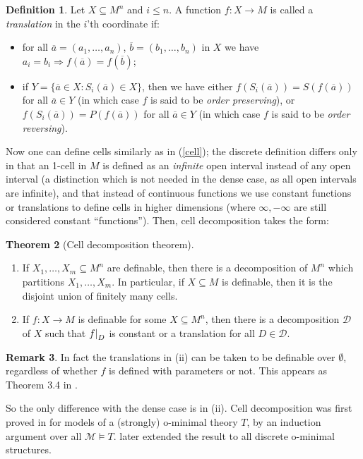 \documentclass[a4paper]{report}
\newcommand{\ind}{\hspace{15pt}}
\newcommand{\D}{\mathcal{D}}
\newcommand{\M}{\mathcal{M}}
\renewcommand{\a}{\overline{a}}
\renewcommand{\b}{\overline{b}}
\renewcommand{\implies}{\Rightarrow}
\newcommand\restr[2]{{\left.\kern-\nulldelimiterspace#1\right|_{#2}}}
\theoremstyle{definition}
\newtheorem{thm}{Theorem}[chapter]
\newtheorem{defn}[thm]{Definition}
\theoremstyle{remstyle}
\newtheorem{rem}[thm]{Remark}
\begin{document}
\begin{defn}
	Let $X\subseteq M^n$ and $i\leq n$. A function $f:X\to M$ is called a \emph{translation} in the $i$'th coordinate if:
	\begin{itemize}
		\item for all $\a=(a_1,\ldots,a_n)$, $\b=(b_1,\ldots,b_n)$ in $X$ we have $a_i=b_i\implies f(\a)=f(\b)$;
		\item if $Y=\{\a\in X:S_i(\a)\in X\}$, then we have either $f(S_i(\a))=S(f(\a))$ for all $\a\in Y$ (in which case $f$ is said to be \emph{order preserving}), or $f(S_i(\a))=P(f(\a))$ for all $\a\in Y$ (in which case $f$ is said to be \emph{order reversing}).
	\end{itemize}
\end{defn}

\ind Now one can define cells similarly as in (\ref{cell}); the discrete definition differs only in that an 1-cell in $M$ is defined as an \emph{infinite} open interval instead of any open interval (a distinction which is not needed in the dense case, as all open intervals are infinite), and that instead of continuous functions we use constant functions or translations to define cells in higher dimensions (where $\infty,-\infty$ are still considered constant ``functions''). Then, cell decomposition takes the form:

\begin{thm}[Cell decomposition theorem]\label{celldecdiscrete}\
	\begin{enumerate}
		\item  If $X_1,\ldots,X_m\subseteq M^n$ are definable, then there is a decomposition of $M^n$ which partitions $X_1,\ldots,X_m$. In particular, if $X\subseteq M$ is definable, then it is the disjoint union of finitely many cells.
		\item If $f:X\to M$ is definable for some $X\subseteq M^n$, then there is a decomposition $\D$ of $X$ such that $\restr{f}{D}$ is constant or a translation for all $D\in\D$.
	\end{enumerate}
\end{thm}

\begin{rem}
	In fact the translations in (ii) can be taken to be definable over $\emptyset$, regardless of whether $f$ is defined with parameters or not. This appears as Theorem 3.4 in \cite{discrete}.
\end{rem}

\ind So the only difference with the dense case is in (ii). Cell decomposition was first proved in \cite{discrete} for models of a (strongly) o-minimal theory $T$, by an induction argument over all $\M\models T$.  later extended the result to all discrete o-minimal structures.
\end{document}
